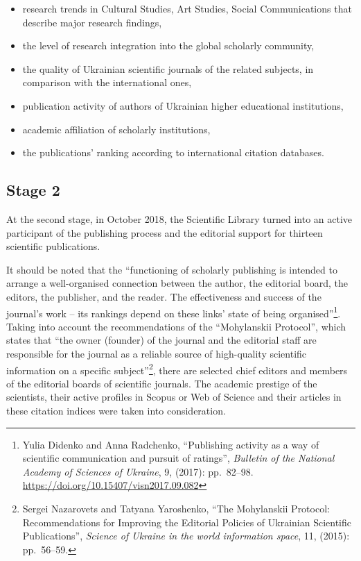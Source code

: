 \documentclass[a4paper,
fontsize=11pt,
oneside,
numbers=noperiodatend,
parskip=half-,
bibliography=totoc,
final
]{scrartcl}
\begin{document}
\begin{itemize}
\item
  research trends in Cultural Studies, Art Studies, Social
  Communications that describe major research findings,
\item
  the level of research integration into the global scholarly community,
\item
  the quality of Ukrainian scientific journals of the related subjects,
  in comparison with the international ones,
\item
  publication activity of authors of Ukrainian higher educational
  institutions,
\item
  academic affiliation of scholarly institutions,
\item
  the publications' ranking according to international citation
  databases.
\end{itemize}

\hypertarget{stage-2}{%
\subsection{Stage 2}\label{stage-2}}

At the second stage, in October 2018, the Scientific Library turned into
an active participant of the publishing process and the editorial
support for thirteen scientific publications.

It should be noted that the \enquote{functioning of scholarly publishing
is intended to arrange a well-organised connection between the author,
the editorial board, the editors, the publisher, and the reader. The
effectiveness and success of the journal's work -- its rankings depend
on these links' state of being organised}\footnote{Yulia Didenko and
  Anna Radchenko, \enquote{Publishing activity as a way of scientific
  communication and pursuit of ratings}, \emph{Bulletin of the National
  Academy of Sciences of Ukraine}, 9, (2017): pp.~82--98.
  \url{https://doi.org/10.15407/visn2017.09.082}}. Taking into account
the recommendations of the \enquote{Mohylanskii Protocol}, which states
that \enquote{the owner (founder) of the journal and the editorial staff
are responsible for the journal as a reliable source of high-quality
scientific information on a specific subject}\footnote{Sergei Nazarovets
  and Tatyana Yaroshenko, \enquote{The Mohylanskii Protocol:
  Recommendations for Improving the Editorial Policies of Ukrainian
  Scientific Publications}, \emph{Science of Ukraine in the world
  information space}, 11, (2015): pp.~56--59.}, there are selected chief
editors and members of the editorial boards of scientific journals. The
academic prestige of the scientists, their active profiles in Scopus or
Web of Science and their articles in these citation indices were taken
into consideration.
\end{document}
